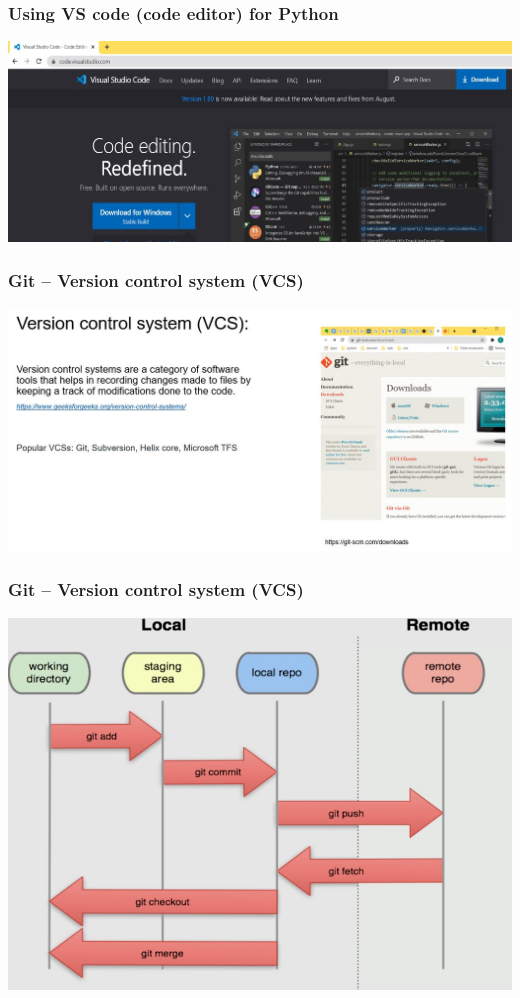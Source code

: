 \documentclass{beamer}
\begin{document}
\begin{frame}
    \frametitle{Using VS code (code editor) for Python}
    \centering
    \includegraphics[scale = 0.5]{figures/vscode.jpg}
\end{frame}

\begin{frame}
    \frametitle{Git – Version control system (VCS)}
    \centering
    \includegraphics[scale = 0.5]{figures/git.jpg}
\end{frame}

\begin{frame}
    \frametitle{Git – Version control system (VCS)}
    \centering
    \includegraphics[scale = 0.5]{figures/git_flow.jpg}
\end{frame}
\end{document}
